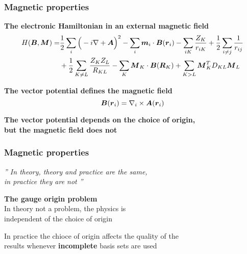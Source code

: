 \begin{frame}
    \frametitle{Magnetic properties}
    \centering
    \textbf{The electronic Hamiltonian in an external magnetic field}
    \begin{align}
        \nonumber
        H(\boldsymbol B,\boldsymbol M) =& \frac{1}{2}\sum_i\Big(-i\nabla + \boldsymbol A\Big)^2
        -\sum_i\boldsymbol m_i\cdot\boldsymbol B(\boldsymbol r_i) - \sum_{iK}\frac{Z_K}{r_{iK}}
        +\frac{1}{2}\sum_{i \neq j}\frac{1}{r_{ij}}\\
        \nonumber
        & + \frac{1}{2}\sum_{K \neq L}
        \frac{Z_K Z_L}{R_{KL}} - \sum_K\boldsymbol M_K\cdot\boldsymbol B(\boldsymbol R_K) +
        \sum_{K>L}\boldsymbol M_K^TD_{KL}\boldsymbol M_L
    \end{align}

    \vspace{10mm}

    \textbf{The vector potential defines the magnetic field}
    \begin{equation}
        \nonumber
        \boldsymbol B(\boldsymbol r_i) = \nabla_i \times \boldsymbol A(\boldsymbol r_i)
    \end{equation}

    \vspace{10mm}

    \textbf{The vector potential depends on the choice of origin,\\
    but the magnetic field does not}
\end{frame}

\begin{frame}
    \frametitle{Magnetic properties}
    \begin{exampleblock}{{
        \begin{center}
        \it{''
        In theory, theory and practice are the same,\\
        in practice they are not
        ''}
        \end{center}
        }}
	\vskip2mm
	\hspace*{}
    \end{exampleblock}

    \pause
    \vspace{10mm}

    \centering
    \textbf{The gauge origin problem}\\
    In theory not a problem, the physics is\\
    independent of the choice of origin\\

    \vspace{5mm}

    In practice the chioce of origin affects the quality of the\\
    results whenever \textbf{incomplete} basis sets are used
\end{frame}

